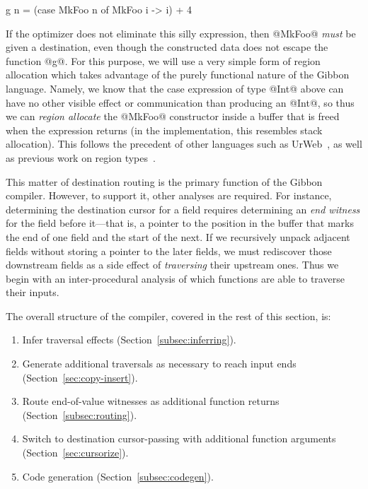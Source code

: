 \documentclass[a4paper,english]{lipics-v2016}
\newcommand{\treelang}{Gibbon\xspace} %
\newif\ifcurly
\newcommand{\finishmecurly}{\ifcurly \Red{FINISHME - do ifcurly version here} \else}
\begin{document}
\finishmecurly
\begin{code}
  g n = (case MkFoo n of MkFoo i -> i) + 4
\end{code}
\fi

If the optimizer does not eliminate this silly expression, then @MkFoo@ {\em
  must} be given a destination, even though the constructed data does not escape
the function @g@.  For this purpose, we will use a very simple form of region
allocation which takes advantage of the purely functional nature of the
\treelang language.  Namely, we know that the case expression of type @Int@
above can have no other visible effect or communication than producing an @Int@,
so thus we can {\em region allocate} the @MkFoo@ constructor inside a buffer
that is freed when the expression returns (in the implementation, this resembles
stack allocation).  This follows the precedent of other languages such as
UrWeb~\cite{urweb}, as well as previous work on region
types~\cite{mlkit,Grossman2002}.


This matter of destination routing is the primary function of the \treelang
compiler.  However, to support it, other analyses are required.  For instance,
determining the destination cursor for a field requires determining an {\em end
  witness} for the field before it---that is, a pointer to the position in the
buffer that marks the end of one field and the start of the next.  If we
recursively unpack adjacent fields without storing a pointer to the later
fields, we must rediscover those downstream fields as a side effect of
{\em traversing} their upstream ones.  Thus we begin with an inter-procedural
analysis of which functions are able to traverse their inputs.

The overall structure of the compiler, covered in the rest of this
section, is:
\begin{enumerate}
\item Infer traversal effects (Section~\ref{subsec:inferring}).
\item Generate additional traversals as necessary to reach input ends (Section~\ref{sec:copy-insert}).
\item Route end-of-value witnesses as additional function returns (Section~\ref{subsec:routing}).
\item Switch to destination cursor-passing with additional function arguments (Section~\ref{sec:cursorize}).
\item Code generation (Section~\ref{subsec:codegen}).
\end{enumerate}
\end{document}
